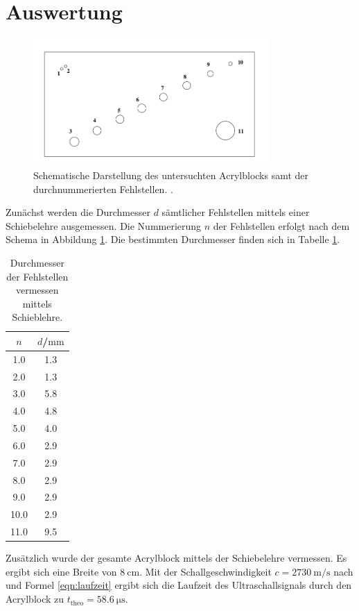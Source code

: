 \section{Auswertung}
\label{sec:Auswertung}
\begin{figure}
  \centering
  \includegraphics[width=0.8\textwidth]{Bilder/fehlstellen.png}
  \caption{Schematische Darstellung des untersuchten Acrylblocks samt der durchnummerierten Fehlstellen. \cite{Anleitung}.}
  \label{fig:fehlstellen}
\end{figure}
Zunächst werden die Durchmesser $d$ sämtlicher Fehlstellen mittels einer Schiebelehre ausgemessen. Die Nummerierung $n$ der Fehlstellen erfolgt nach dem Schema in Abbildung \ref{fig:fehlstellen}. Die bestimmten Durchmesser finden sich in Tabelle \ref{tab:fehlstellen}.
\begin{table}
  \centering
	\caption{Durchmesser der Fehlstellen vermessen mittels Schieblehre.}
	\label{tab:fehlstellen}
	\begin{tabular}{cc}
		\toprule
    $n$ & $d$/$\si{\milli\meter}$ \\
		\midrule
1.0 & 1.3 \\
2.0 & 1.3 \\
3.0 & 5.8 \\
4.0 & 4.8 \\
5.0 & 4.0 \\
6.0 & 2.9 \\
7.0 & 2.9 \\
8.0 & 2.9 \\
9.0 & 2.9 \\
10.0 & 2.9 \\
11.0 & 9.5 \\
\bottomrule
\end{tabular}
\end{table}
Zusätzlich wurde der gesamte Acrylblock mittels der Schiebelehre vermessen. Es ergibt sich eine Breite von ${\SI{8}{\centi\meter}}$. Mit der Schallgeschwindigkeit ${c=\SI{2730}{\meter\per\second}}$ nach \cite{schall} und Formel \eqref{eqn:laufzeit} ergibt sich die Laufzeit des Ultraschallsignals durch den Acrylblock zu ${t_{\mathrm{theo}}=\SI{58.6}{\micro\second}}$.
